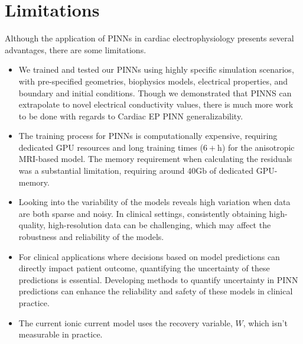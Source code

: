 \section{Limitations}
Although the application of PINNs in cardiac electrophysiology presents several advantages, there are some limitations.
\begin{itemize}

\item We trained and tested our PINNs using highly specific simulation scenarios, with pre-specified geometries, biophysics models, electrical properties, and boundary and initial conditions. Though we demonstrated that PINNS can extrapolate to novel  electrical conductivity values, there is much more work to be done with regards to Cardiac EP PINN generalizability.

\item The training process for PINNs is computationally expensive, requiring dedicated GPU resources and long training times ($6+\mathrm{h}$) for the anisotropic MRI-based model. The memory requirement when calculating the residuals was a substantial limitation, requiring around $40\mathrm{Gb}$ of dedicated GPU-memory. 

\item Looking into the variability of the models reveals high variation when data are both sparse and noisy. In clinical settings, consistently obtaining high-quality, high-resolution data can be challenging, which may affect the robustness and reliability of the models.

\item For clinical applications where decisions based on model predictions can directly impact patient outcome, quantifying the uncertainty of these predictions is essential. Developing methods to quantify uncertainty in PINN predictions can enhance the reliability and safety of these models in clinical practice.

\item The current ionic current model uses the recovery variable, $W$, which isn't measurable in practice.


\end{itemize}
